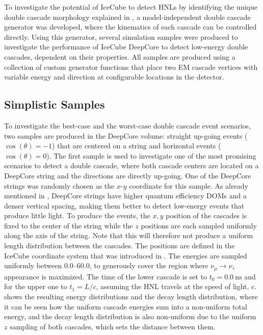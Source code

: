 To investigate the potential of IceCube to detect HNLs by identifying the unique double cascade morphology explained in , a model-independent double cascade generator was developed, where the kinematics of each cascade can be controlled directly. Using this generator, several simulation samples were produced to investigate the performance of IceCube DeepCore to detect low-energy double cascades, dependent on their properties. All samples are produced using a collection of custom generator functions \cite{cascade_generator_functions} that place two EM cascade vertices with variable energy and direction at configurable locations in the detector.


\subsection{Simplistic Samples} 


To investigate the best-case and the worst-case double cascade event scenarios, two samples are produced in the DeepCore volume: straight up-going events ($\cos(\theta)=-1$) that are centered on a string and horizontal events ($\cos(\theta)=0$). The first sample is used to investigate one of the most promising scenarios to detect a double cascade, where both cascade centers are located on a DeepCore string and the directions are directly up-going. One of the DeepCore strings was randomly chosen as the $x$-$y$ coordinate for this sample. As already mentioned in , DeepCore strings have higher quantum efficiency DOMs and a denser vertical spacing, making them better to detect low-energy events that produce little light. To produce the events, the $x,y$ position of the cascades is fixed to the center of the string while the $z$ positions are each sampled uniformly along the axis of the string. Note that this will therefore not produce a uniform length distribution between the cascades. The positions are defined in the IceCube coordinate system that was introduced in . The energies are sampled uniformly between \SIrange[range-phrase={~and~}]{0.0}{60.0}{\gev}, to generously cover the region where $\nu_\mu\rightarrow\nu_\tau$ appearance is maximized. The time of the lower cascade is set to $t_0=\SI{0.0}{\nano\second}$ and for the upper one to $t_1=L/c$, assuming the HNL travels at the speed of light, $c$.  shows the resulting energy distributions and the decay length distribution, where it can be seen how the uniform cascade energies sum into a non-uniform total energy, and the decay length distribution is also non-uniform due to the uniform $z$ sampling of both cascades, which sets the distance between them.

